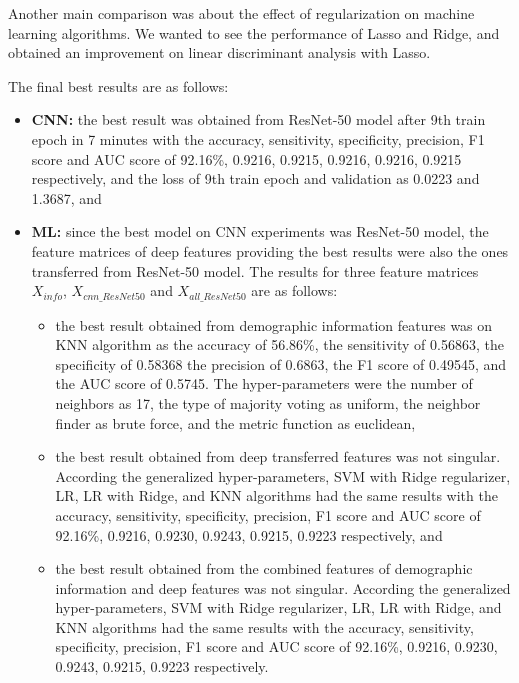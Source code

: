 Another main comparison was about the effect of regularization on machine learning algorithms. We wanted to see the performance of Lasso and Ridge, and obtained an improvement on linear discriminant analysis with Lasso.

The final best results are as follows:
\begin{itemize}
    \item \textbf{CNN:} the best result was obtained from ResNet-50 model after 9th train epoch in 7 minutes with the accuracy, sensitivity, specificity, precision, F1 score and AUC score of 92.16\%, 0.9216, 0.9215, 0.9216, 0.9216, 0.9215 respectively, and the loss of 9th train epoch and validation as 0.0223 and 1.3687, and
    \item \textbf{ML:} since the best model on CNN experiments was ResNet-50 model, the feature matrices of deep features providing the best results were also the ones transferred from ResNet-50 model. The results for three feature matrices $X_{info}$, $X_{cnn\_ResNet50}$ and $X_{all\_ResNet50}$ are as follows:
    \begin{itemize}
        \item the best result obtained from demographic information features was on KNN algorithm as the accuracy of 56.86\%, the sensitivity of 0.56863, the specificity of 0.58368 the precision of 0.6863, the F1 score of 0.49545, and the AUC score of 0.5745. The hyper-parameters were the number of neighbors as 17, the type of majority voting as uniform, the neighbor finder as brute force, and the metric function as euclidean,
        \item the best result obtained from deep transferred features was not singular. According the generalized hyper-parameters, SVM with Ridge regularizer, LR, LR with Ridge, and KNN algorithms had the same results with the accuracy, sensitivity, specificity, precision, F1 score and AUC score of 92.16\%, 0.9216, 0.9230, 0.9243, 0.9215, 0.9223 respectively, and
        \item the best result obtained from the combined features of demographic information and deep features was not singular. According the generalized hyper-parameters, SVM with Ridge regularizer, LR, LR with Ridge, and KNN algorithms had the same results with the accuracy, sensitivity, specificity, precision, F1 score and AUC score of 92.16\%, 0.9216, 0.9230, 0.9243, 0.9215, 0.9223 respectively.
    \end{itemize}
\end{itemize}

